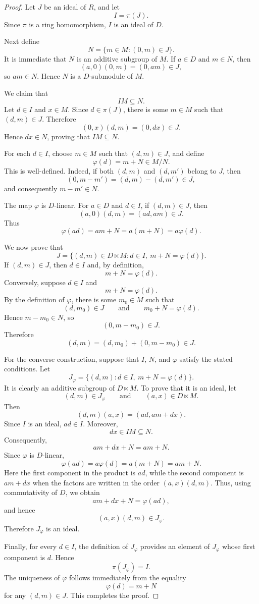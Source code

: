 \documentclass[11pt]{article}
\theoremstyle{definition}
\theoremstyle{remark}
\begin{document}
	\begin{proof}
		Let $J$ be an ideal of $R$, and let
		\[
		I=\pi(J).
		\]
		Since $\pi$ is a ring homomorphism, $I$ is an ideal of $D$.
		
		Next define
		\[
		N=\{m\in M:(0,m)\in J\}.
		\]
		It is immediate that $N$ is an additive subgroup of $M$. If
		$a\in D$ and $m\in N$, then
		\[
		(a,0)(0,m)=(0,am)\in J,
		\]
		so $am\in N$. Hence $N$ is a $D$-submodule of $M$.
		
		We claim that
		\[
		IM\subseteq N.
		\]
		Let $d\in I$ and $x\in M$. Since $d\in\pi(J)$, there is some
		$m\in M$ such that $(d,m)\in J$. Therefore
		\[
		(0,x)(d,m)=(0,dx)\in J.
		\]
		Hence $dx\in N$, proving that $IM\subseteq N$.
		
		For each $d\in I$, choose $m\in M$ such that $(d,m)\in J$, and
		define
		\[
		\varphi(d)=m+N\in M/N.
		\]
		This is well-defined. Indeed, if both $(d,m)$ and $(d,m')$ belong to
		$J$, then
		\[
		(0,m-m')=(d,m)-(d,m')\in J,
		\]
		and consequently $m-m'\in N$.
		
		The map $\varphi$ is $D$-linear. For $a\in D$ and $d\in I$, if
		$(d,m)\in J$, then
		\[
		(a,0)(d,m)=(ad,am)\in J.
		\]
		Thus
		\[
		\varphi(ad)=am+N=a(m+N)=a\varphi(d).
		\]
		
		We now prove that
		\[
		J
		=
		\{(d,m)\in D\ltimes M:
		d\in I,\ m+N=\varphi(d)\}.
		\]
		If $(d,m)\in J$, then $d\in I$ and, by definition,
		\[
		m+N=\varphi(d).
		\]
		Conversely, suppose $d\in I$ and
		\[
		m+N=\varphi(d).
		\]
		By the definition of $\varphi$, there is some $m_0\in M$ such that
		\[
		(d,m_0)\in J
		\qquad\text{and}\qquad
		m_0+N=\varphi(d).
		\]
		Hence $m-m_0\in N$, so
		\[
		(0,m-m_0)\in J.
		\]
		Therefore
		\[
		(d,m)=(d,m_0)+(0,m-m_0)\in J.
		\]
		
		For the converse construction, suppose that $I$, $N$, and $\varphi$
		satisfy the stated conditions. Let
		\[
		J_\varphi
		=
		\{(d,m):d\in I,\ m+N=\varphi(d)\}.
		\]
		It is clearly an additive subgroup of $D\ltimes M$. To prove that it
		is an ideal, let
		\[
		(d,m)\in J_\varphi
		\qquad\text{and}\qquad
		(a,x)\in D\ltimes M.
		\]
		Then
		\[
		(d,m)(a,x)=(ad,am+dx).
		\]
		Since $I$ is an ideal, $ad\in I$. Moreover,
		\[
		dx\in IM\subseteq N.
		\]
		Consequently,
		\[
		am+dx+N=am+N.
		\]
		Since $\varphi$ is $D$-linear,
		\[
		\varphi(ad)=a\varphi(d)=a(m+N)=am+N.
		\]
		Here the first component in the product is $ad$, while the second
		component is $am+dx$ when the factors are written in the order
		$(a,x)(d,m)$. Thus, using commutativity of $D$, we obtain
		\[
		am+dx+N=\varphi(ad),
		\]
		and hence
		\[
		(a,x)(d,m)\in J_\varphi.
		\]
		Therefore $J_\varphi$ is an ideal.
		
		Finally, for every $d\in I$, the definition of $J_\varphi$ provides
		an element of $J_\varphi$ whose first component is $d$. Hence
		\[
		\pi(J_\varphi)=I.
		\]
		The uniqueness of $\varphi$ follows immediately from the equality
		\[
		\varphi(d)=m+N
		\]
		for any $(d,m)\in J$. This completes the proof.
	\end{proof}
	
\end{document}
